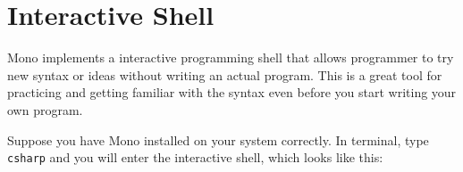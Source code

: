 \documentclass[../main.tex]{subfiles}
\begin{document}
    \section{\csharp Interactive Shell}
    Mono implements a \csharp interactive programming shell that allows programmer
    to try new syntax or ideas without writing an actual \chsarp program. This
    is a great tool for practicing and getting familiar with the syntax even
    before you start writing your own program.

    Suppose you have Mono installed on your system correctly. In terminal, type
    \texttt{csharp} and you will enter the \csharp interactive shell, which looks
    like this:

    \texttt{}
\end{document}
